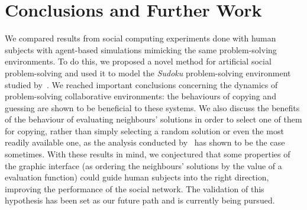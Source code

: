 \documentclass{article}
\begin{document}
\section{Conclusions and Further Work}

We compared results from social computing experiments done with human subjects with agent-based simulations mimicking the same problem-solving environments. To do this, we proposed a novel method for artificial social problem-solving and used it to model the {\em Sudoku} problem-solving environment studied by~\cite{farenzena:collabem}. We reached important conclusions concerning the dynamics of problem-solving collaborative environments: the behaviours of copying and guessing are shown to be beneficial to these systems. We also discuss the benefits of the behaviour of evaluating neighbours' solutions in order to select one of them for copying, rather than simply selecting a random solution or even the most readily available one, as the analysis conducted by~\cite{farenzena:collabem} has shown to be the case sometimes. With these results in mind, we conjectured that some properties of the graphic interface (as ordering the neighbours' solutions by the value of a evaluation function) could guide human subjects into the right direction, improving the performance of the social network. The validation of this hypothesis has been set as our future path and is currently being pursued.



\end{document}

